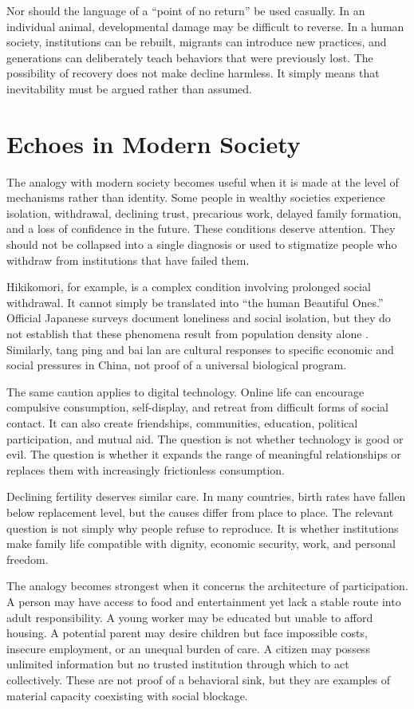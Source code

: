 ﻿\documentclass[12pt,a4paper]{book}
\begin{document}
Nor should the language of a ``point of no return'' be used casually. In an individual animal, developmental damage may be difficult to reverse. In a human society, institutions can be rebuilt, migrants can introduce new practices, and generations can deliberately teach behaviors that were previously lost. The possibility of recovery does not make decline harmless. It simply means that inevitability must be argued rather than assumed.

\section{Echoes in Modern Society}

The analogy with modern society becomes useful when it is made at the level of mechanisms rather than identity. Some people in wealthy societies experience isolation, withdrawal, declining trust, precarious work, delayed family formation, and a loss of confidence in the future. These conditions deserve attention. They should not be collapsed into a single diagnosis or used to stigmatize people who withdraw from institutions that have failed them.

Hikikomori, for example, is a complex condition involving prolonged social withdrawal. It cannot simply be translated into ``the human Beautiful Ones.'' Official Japanese surveys document loneliness and social isolation, but they do not establish that these phenomena result from population density alone \cite{cabinet2025}. Similarly, tang ping and bai lan are cultural responses to specific economic and social pressures in China, not proof of a universal biological program.

The same caution applies to digital technology. Online life can encourage compulsive consumption, self-display, and retreat from difficult forms of social contact. It can also create friendships, communities, education, political participation, and mutual aid. The question is not whether technology is good or evil. The question is whether it expands the range of meaningful relationships or replaces them with increasingly frictionless consumption.

Declining fertility deserves similar care. In many countries, birth rates have fallen below replacement level, but the causes differ from place to place. The relevant question is not simply why people refuse to reproduce. It is whether institutions make family life compatible with dignity, economic security, work, and personal freedom.

The analogy becomes strongest when it concerns the architecture of participation. A person may have access to food and entertainment yet lack a stable route into adult responsibility. A young worker may be educated but unable to afford housing. A potential parent may desire children but face impossible costs, insecure employment, or an unequal burden of care. A citizen may possess unlimited information but no trusted institution through which to act collectively. These are not proof of a behavioral sink, but they are examples of material capacity coexisting with social blockage.
\end{document}

